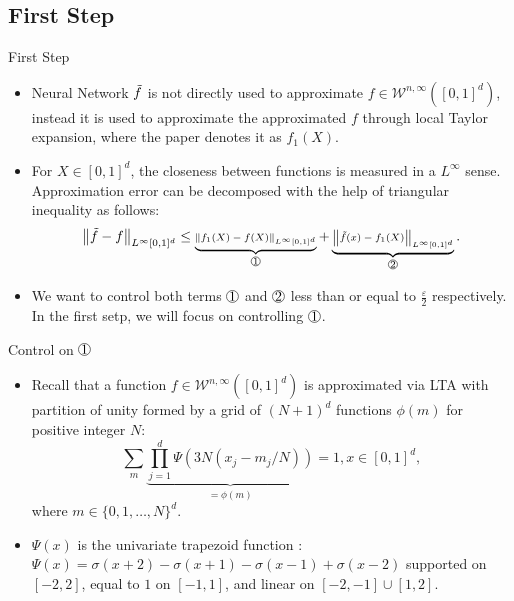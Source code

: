 \documentclass{if-beamer}
\newcommand*\circled[1]{\tikz[baseline=(char.base)]{
            \node[shape=circle,draw,inner sep=0.2pt] (char) {#1};}}
\begin{document}
\subsection{First Step}
\begin{frame}{First Step}
    \begin{itemize}
    \item Neural Network $\Tilde{f}$ is not directly used to approximate $f\in\mathcal{W}^{n,\infty}([0,1]^{d})$, instead it is used to approximate the approximated $f$ through local Taylor expansion, where the paper denotes it as $f_{1}(X)$.
    \item For $X\in[0,1]^{d}$, the closeness between functions is measured in a $L^{\infty}$ sense. Approximation error can be decomposed with the help of triangular inequality as follows:
    \begin{eqnarray*}
        \scriptsize
        \left\| \Tilde{f} - f \right\|_{L^\infty[0,1]^{d}}
        \leq \underbrace{\left\| f_{1}(X) - f(X) \right\|_{L^\infty[0,1]^{d}}}_{\circled{1}} + 
        \underbrace{\left\| \Tilde{f}(x) - f_{1}(X) \right\|_{L^\infty[0,1]^{d}}}_{\circled{2}} .
    \end{eqnarray*}
    
    \item We want to control both terms $\circled{1}$ and $\circled{2}$ less than or equal to $\frac{\varepsilon}{2}$ respectively.
    In the first setp, we will focus on controlling $\circled{1}$.
    \end{itemize}
\end{frame}

\begin{frame}{Control on $\circled{1}$}
    \begin{itemize}
        \item  Recall that a function $f\in\mathcal{W}^{n,\infty}([0,1]^{d})$ is approximated via LTA with partition of unity formed by a grid of $(N+1)^{d}$ functions $\phi(m)$ for positive integer $N$: 
        \begin{equation*}
            \sum_{m} \underbrace{\prod_{j=1}^{d}\Psi(3N(x_{j}-m_{j}/N))}_{=\phi(m)} = 1, x \in [0,1]^{d},
        \end{equation*}
        where $m\in\{0,1,\dots,N\}^{d}$.
        \item  $\Psi(x)$ is the univariate trapezoid function :  $\Psi(x)=\sigma(x+2)-\sigma(x+1)-\sigma(x-1)+\sigma(x-2)$ supported on $[-2,2]$, equal to $1$ on $[-1,1]$, and linear on $[-2,-1] \cup [1,2]$.
    \end{itemize}
\end{frame}
\end{document}
